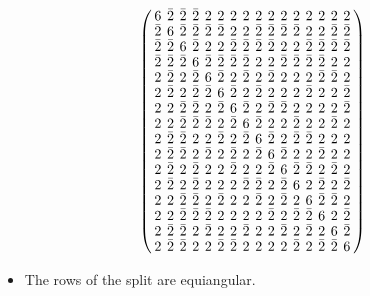 \documentclass{beamer}
\begin{document}
\begin{frame}

  \[
    \arraycolsep=2.0pt\def\arraystretch{0.75}
    \left(
      \begin{array}{cccccccccccccccc}
        6&\bar{2}&\bar{2}&\bar{2}&2&2&2&2&2&2&2&2&2&2&2&2\\
        \bar{2}&6&\bar{2}&\bar{2}&\bar{2}&\bar{2}&2&2&\bar{2}&\bar{2}&\bar{2}&\bar{2}&2&2&\bar{2}&\bar{2}\\
        \bar{2}&\bar{2}&6&\bar{2}&2&2&\bar{2}&\bar{2}&\bar{2}&\bar{2}&2&2&\bar{2}&\bar{2}&\bar{2}&\bar{2}\\
        \bar{2}&\bar{2}&\bar{2}&6&\bar{2}&\bar{2}&\bar{2}&\bar{2}&2&2&\bar{2}&\bar{2}&\bar{2}&\bar{2}&2&2\\
        2&\bar{2}&2&\bar{2}&6&\bar{2}&2&\bar{2}&2&\bar{2}&2&2&2&\bar{2}&\bar{2}&2\\
        2&\bar{2}&2&\bar{2}&\bar{2}&6&\bar{2}&2&\bar{2}&2&2&2&\bar{2}&2&2&\bar{2}\\
        2&2&\bar{2}&\bar{2}&2&\bar{2}&6&\bar{2}&2&\bar{2}&\bar{2}&2&2&2&2&\bar{2}\\
        2&2&\bar{2}&\bar{2}&\bar{2}&2&\bar{2}&6&\bar{2}&2&2&\bar{2}&2&2&\bar{2}&2\\
        2&\bar{2}&\bar{2}&2&2&\bar{2}&2&\bar{2}&6&\bar{2}&2&\bar{2}&\bar{2}&2&2&2\\
        2&\bar{2}&\bar{2}&2&\bar{2}&2&\bar{2}&2&\bar{2}&6&\bar{2}&2&2&\bar{2}&2&2\\
        2&\bar{2}&2&\bar{2}&2&2&\bar{2}&2&2&\bar{2}&6&\bar{2}&\bar{2}&2&\bar{2}&2\\
        2&\bar{2}&2&\bar{2}&2&2&2&\bar{2}&\bar{2}&2&\bar{2}&6&2&\bar{2}&2&\bar{2}\\
        2&2&\bar{2}&\bar{2}&2&\bar{2}&2&2&\bar{2}&2&\bar{2}&2&6&\bar{2}&\bar{2}&2\\
        2&2&\bar{2}&\bar{2}&\bar{2}&2&2&2&2&\bar{2}&2&\bar{2}&\bar{2}&6&2&\bar{2}\\
        2&\bar{2}&\bar{2}&2&\bar{2}&2&2&\bar{2}&2&2&\bar{2}&2&\bar{2}&2&6&\bar{2}\\
        2&\bar{2}&\bar{2}&2&2&\bar{2}&\bar{2}&2&2&2&2&\bar{2}&2&\bar{2}&\bar{2}&6\\
      \end{array}
    \right)
  \]

  \begin{itemize}
    \item The rows of the split are equiangular.
  \end{itemize}
  
\end{frame}
\end{document}
